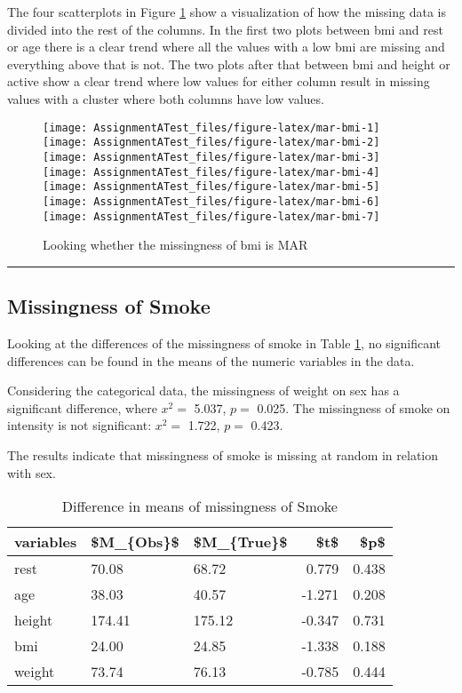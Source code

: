 \documentclass[
]{article}
\begin{document}
The four scatterplots in Figure \ref{fig:mar-bmi} show a visualization of how the missing data is divided into the rest of the columns. In the first two plots between bmi and rest or age there is a clear trend where all the values with a low bmi are missing and everything above that is not. The two plots after that between bmi and height or active show a clear trend where low values for either column result in missing values with a cluster where both columns have low values.

\begin{figure}
\texttt{[image: AssignmentATest\_files/figure-latex/mar-bmi-1]} \texttt{[image: AssignmentATest\_files/figure-latex/mar-bmi-2]} \texttt{[image: AssignmentATest\_files/figure-latex/mar-bmi-3]} \texttt{[image: AssignmentATest\_files/figure-latex/mar-bmi-4]} \texttt{[image: AssignmentATest\_files/figure-latex/mar-bmi-5]} \texttt{[image: AssignmentATest\_files/figure-latex/mar-bmi-6]} \texttt{[image: AssignmentATest\_files/figure-latex/mar-bmi-7]} \caption{Looking whether the missingness of bmi is MAR}\label{fig:mar-bmi}
\end{figure}

\begin{center}\rule{0.5\linewidth}{0.5pt}\end{center}

\hypertarget{MissS}{%
\subsection{Missingness of Smoke}\label{MissS}}

Looking at the differences of the missingness of smoke in Table \ref{tab:missS}, no significant differences can be found in the means of the numeric variables in the data.

Considering the categorical data, the missingness of weight on sex has a significant difference, where \(x^2 =\) 5.037, \(p =\) 0.025. The missingness of smoke on intensity is not significant: \(x^2 =\) 1.722, \(p =\) 0.423.

The results indicate that missingness of smoke is missing at random in relation with sex.

\begin{table}

\caption{\label{tab:missS}Difference in means of missingness of Smoke}
\centering
\begin{tabular}[t]{l|l|l|r|r}
\hline
variables & \$M\_\{Obs\}\$ & \$M\_\{True\}\$ & \$t\$ & \$p\$\\
\hline
rest & 70.08 & 68.72 & 0.779 & 0.438\\
\hline
age & 38.03 & 40.57 & -1.271 & 0.208\\
\hline
height & 174.41 & 175.12 & -0.347 & 0.731\\
\hline
bmi & 24.00 & 24.85 & -1.338 & 0.188\\
\hline
weight & 73.74 & 76.13 & -0.785 & 0.444\\
\hline
\end{tabular}
\end{table}
\end{document}
